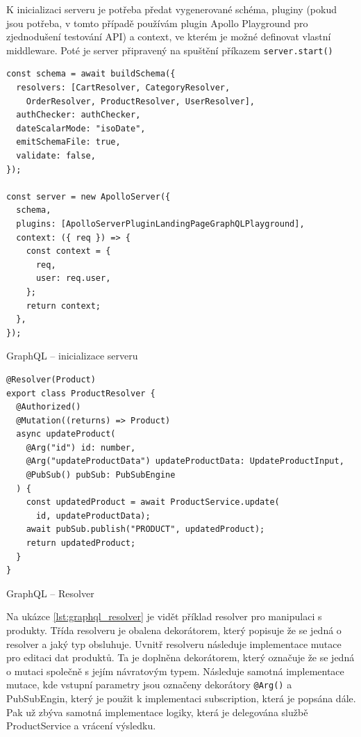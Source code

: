 \documentclass[thesis=M,czech]{FITthesis}[2019/12/23]
\begin{document}
K inicializaci serveru je potřeba předat vygenerované schéma, pluginy (pokud jsou potřeba, v tomto případě používám plugin Apollo Playground pro zjednodušení testování API) a context, ve kterém je možné definovat vlastní middleware. Poté je server připravený na spuštění příkazem \texttt{server.start()}

\begin{listing}
\begin{verbatim}
const schema = await buildSchema({
  resolvers: [CartResolver, CategoryResolver,
    OrderResolver, ProductResolver, UserResolver],
  authChecker: authChecker,
  dateScalarMode: "isoDate",
  emitSchemaFile: true,
  validate: false,
});

const server = new ApolloServer({
  schema,
  plugins: [ApolloServerPluginLandingPageGraphQLPlayground],
  context: ({ req }) => {
    const context = {
      req,
      user: req.user,
    };
    return context;
  },
});
\end{verbatim}
\caption{GraphQL -- inicializace serveru}
\label{lst:example}
\end{listing}

\begin{listing}[H]
\begin{verbatim}
@Resolver(Product)
export class ProductResolver {
  @Authorized()
  @Mutation((returns) => Product)
  async updateProduct(
    @Arg("id") id: number,
    @Arg("updateProductData") updateProductData: UpdateProductInput,
    @PubSub() pubSub: PubSubEngine
  ) {
    const updatedProduct = await ProductService.update(
      id, updateProductData);
    await pubSub.publish("PRODUCT", updatedProduct);
    return updatedProduct;
  }
}
\end{verbatim}
\caption{GraphQL -- Resolver}
\label{lst:graphql_resolver}
\end{listing}

Na ukázce \ref{lst:graphql_resolver} je vidět příklad resolver pro manipulaci s produkty. Třída resolveru je obalena dekorátorem, který popisuje že se jedná o resolver a jaký typ obsluhuje. Uvnitř resolveru následuje implementace mutace pro editaci dat produktů. Ta je doplněna dekorátorem, který označuje že se jedná o mutaci společně s jejím návratovým typem. Následuje samotná implementace mutace, kde vstupní parametry jsou označeny dekorátory \texttt{@Arg()} a PubSubEngin, který je použit k implementaci subscription, která je popsána dále. Pak už zbýva samotná implementace logiky, která je delegována službě ProductService a vrácení výsledku.
\end{document}
